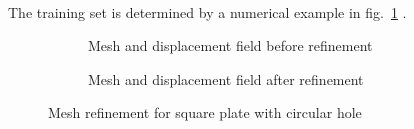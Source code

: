 \paragraph{}
The training set is determined by a numerical example in fig.~\ref{adap_fig:svm_train} \cite{Duval2018}.
\begin{figure}[!ht]
    \centering
    \begin{subfigure}[b]{0.5\linewidth}
        \caption{Mesh and displacement field before refinement}
    \end{subfigure}
    \begin{subfigure}[b]{0.5\linewidth}
        \caption{Mesh and displacement field after refinement}
    \end{subfigure}
    \caption{Mesh refinement for square plate with circular hole \cite{Duval2018}}
    \label{adap_fig:svm_train}
\end{figure}


